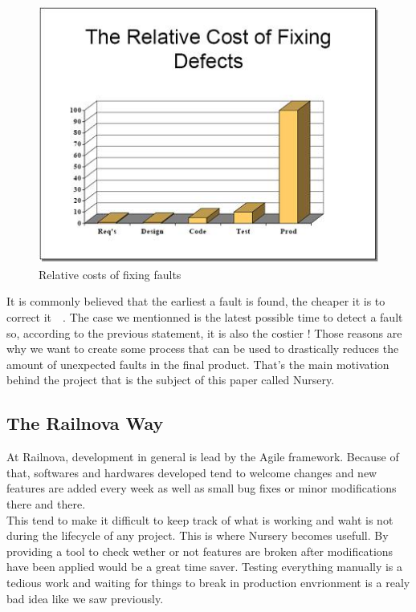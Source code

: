 \documentclass[12pt]{article}
\begin{document}
\begin{figure}
    \centering
    \includegraphics[scale=0.8]{STBC-costfixs.jpg}
    \caption{Relative costs of fixing faults~\cite{EconomicsSTBC:2017}}
    \label{STBC-costfixs}
\end{figure}

It is commonly believed that the earliest a fault is found, the cheaper it is to correct it~\cite{EconomicsSTBC:2017}~\cite{EconomicsWiki:2017}. The case we mentionned is the latest possible time to detect a fault so, according to the previous statement, it is also the costier ! Those reasons are why we want to create some process that can be used to drastically reduces the amount of unexpected faults in the final product. That's the main motivation behind the project that is the subject of this paper called Nursery.\\

\subsection{The Railnova Way}

At Railnova, development in general is lead by the Agile framework. Because of that, softwares and hardwares developed tend to welcome changes and new features are added every week as well as small bug fixes or minor modifications there and there.\\

This tend to make it difficult to keep track of what is working and waht is not during the lifecycle of any project. This is where Nursery becomes usefull. By providing a tool to check wether or not features are broken after modifications have been applied would be a great time saver. Testing everything manually is a tedious work and waiting for things to break in production envrionment is a realy bad idea like we saw previously.\\
\end{document}
